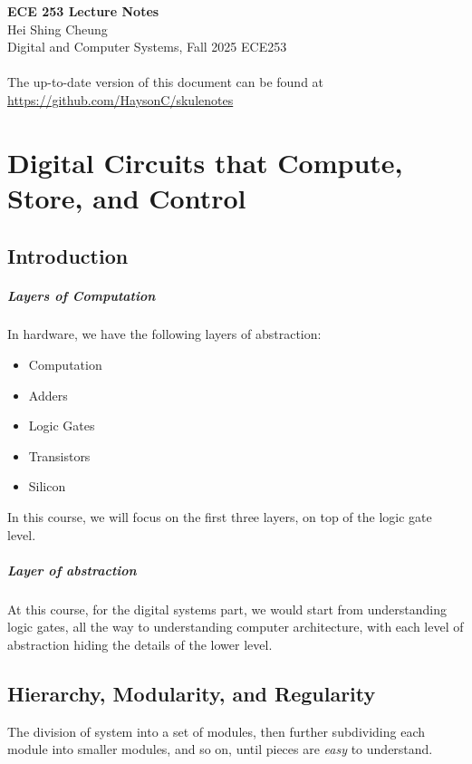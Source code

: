 \documentclass[11pt]{report}
\begin{document}
\thispagestyle{empty}
{\LARGE \bf ECE 253 Lecture Notes}\\
{\large Hei Shing Cheung}\\
Digital and Computer Systems, Fall 2025 \hfill ECE253\\
\\
The up-to-date version of this document can be found at \url{https://github.com/HaysonC/skulenotes}\\

\chapter{Digital Circuits that Compute, Store, and Control}
\begin{shaded}
\section*{Introduction}
\paragraph{Layers of Computation} In hardware, we have the following layers of abstraction:
\begin{itemize}
    \item Computation
    \item Adders 
    \item Logic Gates
    \item Transistors
    \item Silicon
\end{itemize}
In this course, we will focus on the first three layers, on top of the logic gate level.


\paragraph{Layer of abstraction} At this course, for the digital systems part, we would start from understanding logic gates, all the way to understanding computer architecture, with each level of abstraction hiding the details of the lower level.

\section{Hierarchy, Modularity, and Regularity}

\begin{definition}[Hierarchy]
    The division of system into a set of modules, then further subdividing each module into smaller modules, and so on, until pieces are \textit{easy} to understand.    
\end{definition}


\end{shaded}
\end{document}

